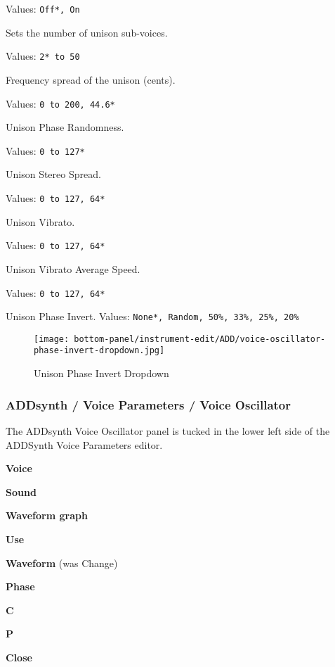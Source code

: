    Values: \texttt{Off*, On}

   Sets the number of unison sub-voices.

   Values: \texttt{2* to 50}

   Frequency spread of the unison (cents).

   Values: \texttt{0 to 200, 44.6*}

   Unison Phase Randomness.

   Values: \texttt{0 to 127*}

   Unison Stereo Spread.

   Values: \texttt{0 to 127, 64*}

   Unison Vibrato.

   Values: \texttt{0 to 127, 64*}

   Unison Vibrato Average Speed.

   Values: \texttt{0 to 127, 64*}

   Unison Phase Invert.
   Values: \texttt{None*, Random, 50\%, 33\%, 25\%, 20\%}

\begin{figure}[H]
   \centering
   \texttt{[image: bottom-panel/instrument-edit/ADD/voice-oscillator-phase-invert-dropdown.jpg]}
   \caption{Unison Phase Invert Dropdown}
   \label{fig:phase_invert_dropdown}
\end{figure}


\subsubsection{ADDsynth / Voice Parameters / Voice Oscillator}
\label{subsubsec:addsynth_voice_parameters_oscillator}

   The ADDsynth Voice Oscillator panel is tucked in the lower left side of the
   ADDSynth Voice Parameters editor.

   \begin{enumber}
     \item \textbf{Voice}
      \item \textbf{Sound}
      \item \textbf{Waveform graph}
      \item \textbf{Use}
      \item \textbf{Waveform} (was Change)
      \item \textbf{Phase}
      \item \textbf{C}
      \item \textbf{P}
      \item \textbf{Close}
   \end{enumber}


